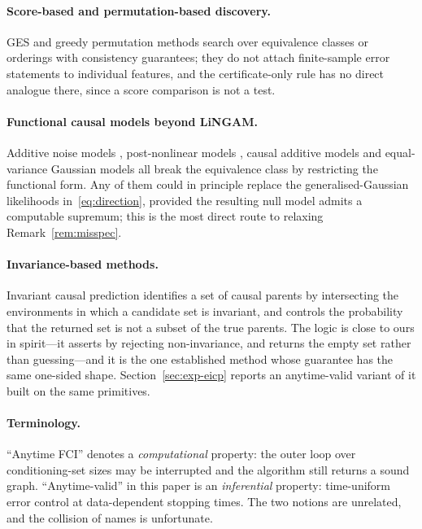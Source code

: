 \documentclass[pdflatex,sn-apa]{sn-jnl}
\theoremstyle{thmstyleone}%
\theoremstyle{thmstyletwo}%
\theoremstyle{thmstylethree}%
\begin{document}
\paragraph{Score-based and permutation-based discovery.} GES
\citep{chickering2002optimal} and greedy permutation methods
\citep{solus2021consistency} search over equivalence classes or orderings with
consistency guarantees; they do not attach finite-sample error statements to
individual features, and the certificate-only rule has no direct analogue
there, since a score comparison is not a test.

\paragraph{Functional causal models beyond LiNGAM.} Additive noise models
\citep{hoyer2009nonlinear}, post-nonlinear models
\citep{zhang2009identifiability}, causal additive models
\citep{buhlmann2014cam} and equal-variance Gaussian models
\citep{peters2014identifiability} all break the equivalence class by
restricting the functional form. Any of them could in principle replace the
generalised-Gaussian likelihoods in~\eqref{eq:direction}, provided the
resulting null model admits a computable supremum; this is the most direct
route to relaxing Remark~\ref{rem:misspec}.

\paragraph{Invariance-based methods.} Invariant causal prediction
\citep{peters2016causal} identifies a set of causal parents by intersecting
the environments in which a candidate set is invariant, and controls the
probability that the returned set is not a subset of the true parents. The
logic is close to ours in spirit---it asserts by rejecting non-invariance, and
returns the empty set rather than guessing---and it is the one established
method whose guarantee has the same one-sided shape.
Section~\ref{sec:exp-eicp} reports an anytime-valid variant of it built on the
same primitives.

\paragraph{Terminology.} ``Anytime FCI'' \citep{spirtes2001anytime} denotes a
\emph{computational} property: the outer loop over conditioning-set sizes may
be interrupted and the algorithm still returns a sound graph.
``Anytime-valid'' in this paper is an \emph{inferential} property:
time-uniform error control at data-dependent stopping times. The two notions
are unrelated, and the collision of names is unfortunate.
\end{document}
